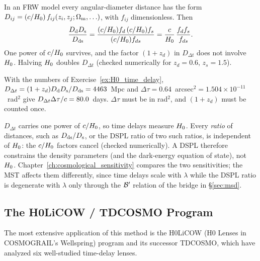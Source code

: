 \begin{derivation}
In an FRW model every angular-diameter distance has the form
$D_{ij} = (c/H_0)\,f_{ij}(z_i, z_j; \Omega_{\mathrm{m}}, \ldots)$, with
$f_{ij}$ dimensionless.  Then
\[
  \frac{D_{\mathrm{d}}D_{\mathrm{s}}}{D_{\mathrm{ds}}}
  = \frac{(c/H_0)f_d\,(c/H_0)f_s}{(c/H_0)f_{ds}}
  = \frac{c}{H_0}\,\frac{f_df_s}{f_{ds}} .
\]
One power of $c/H_0$ survives, and the factor $(1+z_d)$ in
$D_{\Delta t}$ does not involve $H_0$.  Halving $H_0$ doubles
$D_{\Delta t}$ (checked numerically for $z_d = 0.6$, $z_s = 1.5$).
\end{derivation}

\begin{annotation}
With the numbers of Exercise~\ref{ex:H0_time_delay},
$D_{\Delta t} = (1+z_d)D_{\mathrm{d}}D_{\mathrm{s}}/D_{\mathrm{ds}} = 4463$~Mpc and
$\Delta\tau = 0.64$~arcsec$^2 = 1.504\times10^{-11}$~rad$^2$ give
$D_{\Delta t}\Delta\tau/c = 80.0$~days.  $\Delta\tau$ must be in
rad$^2$, and $(1+z_d)$ must be counted once.
\end{annotation}

\begin{bridge}
$D_{\Delta t}$ carries one power of $c/H_0$, so time delays
measure $H_0$.
Every \emph{ratio} of distances, such as $D_{\mathrm{ds}}/D_{\mathrm{s}}$, or the DSPL ratio of two
such ratios, is independent of $H_0$: the $c/H_0$ factors
cancel (checked numerically).  A DSPL therefore constrains
the density parameters (and the dark-energy equation of state), not
$H_0$.  Chapter~\ref{ch:cosmological_sensitivity}
compares the two sensitivities; the MST affects them differently, since time
delays scale with $\lambda$ while the DSPL ratio is degenerate with $\lambda$
only through the $\mathcal{B}'$ relation of the bridge in \S\ref{sec:msd}.
\end{bridge}


\subsection{The H0LiCOW / TDCOSMO Program}

The most extensive application of this method is the
H0LiCOW (H0 Lenses in COSMOGRAIL's Wellspring) program
and its successor TDCOSMO, which have analyzed six
well-studied time-delay lenses.

